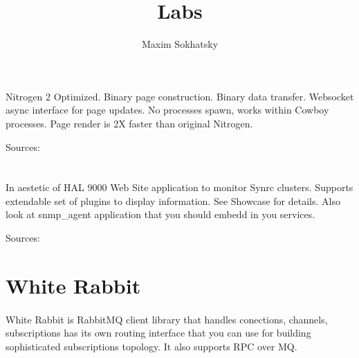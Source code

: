 \documentclass[11pt]{article}
\begin{document}
\title{Labs}
\author{Maxim Sokhatsky}


\section*{}
\paragraph{}
Nitrogen 2 Optimized. Binary page construction. Binary data transfer.
Websocket async interface for page updates. No processes spawn, works
within Cowboy processes. Page render is 2X faster than original Nitrogen.

Sources: 

\section*{}
\paragraph{}
In aestetic of HAL 9000 Web Site application to monitor Synrc clusters.
Supports extendable set of plugins to display information. See Showcase for details.
Also look at snmp_agent application that you should embedd in you services.

Sources: 

\section*{White Rabbit}
\paragraph{}
White Rabbit is RabbitMQ client library that handles conections, channels,
subscriptions has its own routing interface that you can use for building
sophisticated subscriptions topology. It also supports RPC over MQ.
\end{document}
